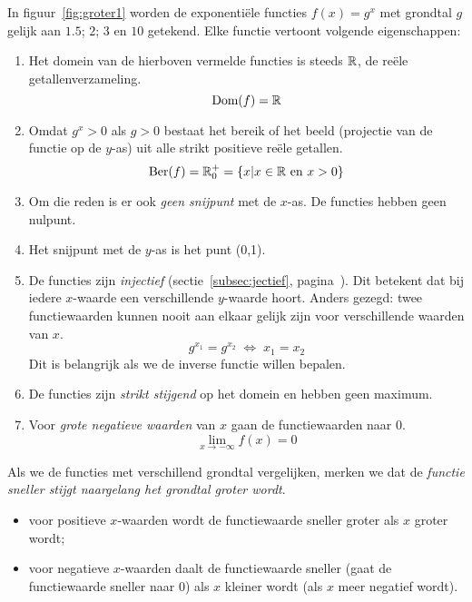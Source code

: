 In figuur~\ref{fig:groter1} worden de exponenti\"ele functies $f(x)=g^x$ met grondtal $g$ gelijk aan $\num{1.5}$; $2$; $3$ en $10$ getekend. Elke functie vertoont volgende eigenschappen: 
\begin{enumerate}
    \item  Het domein van de hierboven vermelde functies is steeds $\mathbb{R}$, de re\"{e}le
    getallenverzameling.
    \[
      \text{Dom}(f)=\mathbb{R}
    \]

    \item  Omdat $g^x>0$ als $g>0$ bestaat het bereik of het beeld (projectie van de functie op de $y$-as) uit alle strikt positieve re\"{e}le getallen. 
    \[
      \text{Ber}(f)=\mathbb{R}^+_0=\{x|x\in \mathbb{R} \text{~en~} x>0\}
    \]
    
    \item Om die reden is er ook \emph{geen snijpunt} met de $x$-as. De functies hebben  geen nulpunt.

    \item  Het snijpunt met de $y$-as is het punt (0,1).

  
    \item  \label{exp_func:inject} De functies zijn \emph{injectief} (sectie~\ref{subsec:jectief}, pagina~\pageref{subsec:jectief}). Dit betekent dat bij iedere $x$-waarde een verschillende $y$-waarde hoort. Anders gezegd: twee
    functiewaarden  kunnen nooit aan elkaar gelijk zijn  voor
    verschillende waarden van $x$. 
        \begin{displaymath}
        g^{x_{1}}=g^{x_{2}}   \; \Leftrightarrow \; x_{1}=x_{2}
    \end{displaymath}
    Dit is belangrijk als we de inverse functie willen bepalen.
    
    \item  De functies zijn  \emph{strikt stijgend} op het domein en
    hebben geen maximum.

    \item  Voor \emph{grote negatieve waarden} van $x$ gaan de functiewaarden naar 0.
    \[
    \lim_{x\rightarrow-\infty}f(x)=0
    \]

\end{enumerate}
Als we de functies met verschillend grondtal vergelijken, merken we dat de \emph{functie sneller stijgt naargelang het grondtal groter wordt}. 
\begin{itemize}
\item voor positieve $x$-waarden wordt de functiewaarde sneller groter als $x$ groter wordt;
\item voor negatieve $x$-waarden daalt de functiewaarde sneller (gaat de functiewaarde sneller naar $0$) als  $x$ kleiner wordt (als $x$ meer negatief wordt).
\end{itemize}




